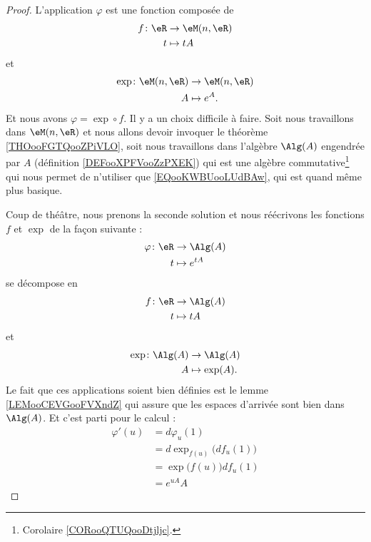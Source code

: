 \begin{proof}
	L'application \( \varphi\) est une fonction composée de
	\begin{equation}
		\begin{aligned}
			f\colon \eR & \to \eM(n,\eR) \\
			t           & \mapsto tA
		\end{aligned}
	\end{equation}
	et
	\begin{equation}
		\begin{aligned}
			\exp\colon \eM(n,\eR) & \to \eM(n,\eR) \\
			A                     & \mapsto e^A.
		\end{aligned}
	\end{equation}
	Et nous avons \( \varphi=\exp\circ f\). Il y a un choix difficile à faire. Soit nous travaillons dans \( \eM(n,\eR)\) et nous allons devoir invoquer le théorème \ref{THOooFGTQooZPiVLO}, soit nous travaillons dans l'algèbre \( \Alg(A)\)  engendrée par \( A\) (définition \ref{DEFooXPFVooZzPXEK})
	qui est une algèbre commutative\footnote{Corolaire \ref{CORooQTUQooDtjljc}.} qui nous permet de n'utiliser que \ref{EQooKWBUooLUdBAw}, qui est quand même plus basique.

	Coup de théâtre, nous prenons la seconde solution et nous réécrivons les fonctions \( f\) et \( \exp\) de la façon suivante :
	\begin{equation}
		\begin{aligned}
			\varphi\colon \eR & \to \Alg(A)     \\
			t                 & \mapsto  e^{tA}
		\end{aligned}
	\end{equation}
	se décompose en
	\begin{equation}
		\begin{aligned}
			f\colon \eR & \to \Alg(A) \\
			t           & \mapsto tA
		\end{aligned}
	\end{equation}
	et
	\begin{equation}
		\begin{aligned}
			\exp\colon \Alg(A) & \to \Alg(A) \\
            A                  & \mapsto \exp(A).
		\end{aligned}
	\end{equation}
	Le fait que ces applications soient bien définies est le lemme \ref{LEMooCEVGooFVXndZ} qui assure que les espaces d'arrivée sont bien dans \( \Alg(A)\). Et c'est parti pour le calcul :
	\begin{subequations}
		\begin{align}
			\varphi'(u) & =d\varphi_u(1)      \label{SUBEQooFDPQooBzTDXF}                    \\
			            & =d\exp_{f(u)}\big( df_u(1) \big)       \label{SUBEQooVOFWooDoTQGy} \\
			            & =\exp\big( f(u) \big)df_u(1)       \label{SUBEQooCILLooHsFDOE}     \\
			            & = e^{uA}A      \label{SUBEQooBMAQooNtbzBI}
		\end{align}
	\end{subequations}


\end{proof}
